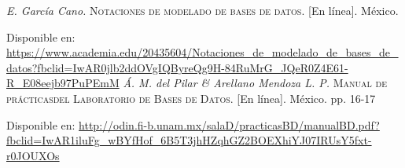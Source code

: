 \begin{thebibliography}{}
	\textit{E. García Cano.}
	\textsc{Notaciones de modelado de bases de datos.} [En línea]. México.
	
	\linebreak
	Disponible en:
	\url{https://www.academia.edu/20435604/Notaciones_de_modelado_de_bases_de_datos?fbclid=IwAR0jlb2ddOVgIQByreQg9H-84RuMrG_JQeR0Z4E61-R_E08eejb97PuPEmM}
	\textit{Á. M. del Pilar \& Arellano Mendoza L. P.}
	\textsc{Manual de prácticasdel Laboratorio de Bases de Datos.} [En línea]. México. pp. 16-17
	
	\linebreak
	Disponible en: 
	\url{http://odin.fi-b.unam.mx/salaD/practicasBD/manualBD.pdf?fbclid=IwAR1iluFg_wBYfHof_6B5T3jhHZqhGZ2BOEXhiYJ07IRUsY5fxt-r0JOUXOs}	
	
	
	
	
\end{thebibliography}
